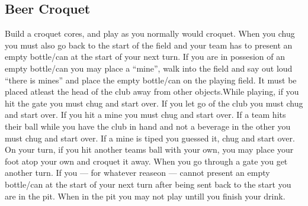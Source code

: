 \documentclass[../../../main.tex]{subfiles}
\begin{document}
\begin{multicols}{2}
\subsection{Beer Croquet}
Build a croquet cores, and play as you normally would croquet. When you chug you must also go back to the start of the field and your team has to present an empty bottle/can at the start of your next turn. If you are in possesion of an empty bottle/can you may place a ``mine'', walk into the field and say out loud ``there is mines'' and place the empty bottle/can on the playing field. It must be placed atleast the head of the club away from other objects.While playing, if you hit the gate you must chug and start over. If you let go of the club you must chug and start over. If you hit a mine you must chug and start over. If a team hits their ball while you have the club in hand and not a beverage in the other you must chug and start over. If a mine is tiped you guessed it, chug and start over. On your turn, if you hit another teams ball with your own, you may place your foot atop your own and croquet it away. When you go through a gate you get another turn. If you --- for whatever reaseon --- cannot present an empty bottle/can at the start of your next turn after being sent back to the start you are in the pit. When in the pit you may not play untill you finish your drink.

\end{multicols}
\end{document}
